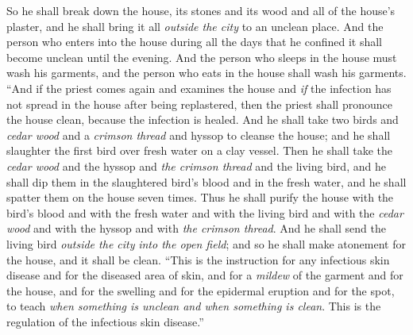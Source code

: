 \begin{biblechapter}
\verse So he shall break down the house, its stones and its wood and all of the house’s plaster, and he shall bring it all \textit{outside the city} to an unclean place.
\verse And the person who enters into the house during all the days that he confined it shall become unclean until the evening.
\verse And the person who sleeps in the house must wash his garments, and the person who eats in the house shall wash his garments.
\verse “And if the priest comes again and examines the house and \textit{if} the infection has not spread in the house after being replastered, then the priest shall pronounce the house clean, because the infection is healed.
\verse And he shall take two birds and \textit{cedar wood} and a \textit{crimson thread} and hyssop to cleanse the house;
\verse and he shall slaughter the first bird over fresh water on a clay vessel.
\verse Then he shall take the \textit{cedar wood} and the hyssop and \textit{the crimson thread} and the living bird, and he shall dip them in the slaughtered bird’s blood and in the fresh water, and he shall spatter them on the house seven times.
\verse Thus he shall purify the house with the bird’s blood and with the fresh water and with the living bird and with the \textit{cedar wood} and with the hyssop and with \textit{the crimson thread}.
\verse And he shall send the living bird \textit{outside the city} \textit{into the open field}; and so he shall make atonement for the house, and it shall be clean.
\verse “This is the instruction for any infectious skin disease and for the diseased area of skin,
\verse and for a \textit{mildew} of the garment and for the house,
\verse and for the swelling and for the epidermal eruption and for the spot,
\verse to teach \textit{when something is unclean and when something is clean}. This is the regulation of the infectious skin disease.”
\end{biblechapter}

